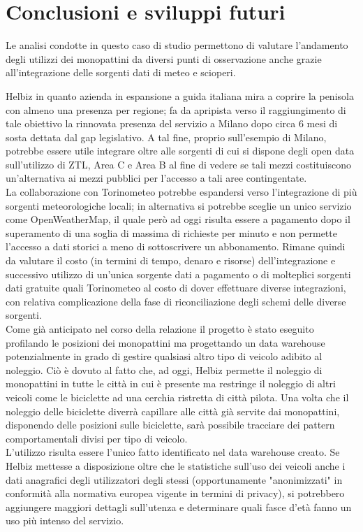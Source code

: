 \chapter{Conclusioni e sviluppi futuri}

Le analisi condotte in questo caso di studio permettono di valutare l'andamento degli 
utilizzi dei monopattini da diversi punti di osservazione anche grazie all’integrazione delle sorgenti dati
di meteo e scioperi.

Helbiz in quanto azienda in espansione a guida italiana mira a coprire la penisola con almeno una presenza per regione; 
fa da apripista verso il raggiungimento di tale obiettivo la rinnovata presenza del servizio a Milano dopo circa 6 mesi di sosta dettata dal gap legislativo.
A tal fine, proprio sull'esempio di Milano, potrebbe essere utile integrare oltre alle sorgenti di cui si dispone degli open data sull'utilizzo di ZTL,
Area C e Area B al fine di vedere se tali mezzi costituiscono un'alternativa ai mezzi pubblici per l'accesso a tali aree contingentate. \\

La collaborazione con Torinometeo potrebbe espandersi verso l'integrazione di più sorgenti meteorologiche locali;
in alternativa si potrebbe sceglie un unico servizio come OpenWeatherMap, il quale però ad oggi risulta essere a pagamento dopo il superamento di una soglia di
massima di richieste per minuto e non permette l'accesso a dati storici a meno di sottoscrivere un abbonamento.
Rimane quindi da valutare il costo (in termini di tempo, denaro e risorse) dell'integrazione e successivo utilizzo di un'unica sorgente dati a pagamento o di
molteplici sorgenti dati gratuite quali Torinometeo al costo di dover effettuare diverse integrazioni, con relativa complicazione della fase di
riconciliazione degli schemi delle diverse sorgenti.\\

Come già anticipato nel corso della relazione il progetto è stato eseguito profilando le posizioni dei monopattini ma progettando un data warehouse potenzialmente
in grado di gestire qualsiasi altro tipo di veicolo adibito al noleggio.
Ciò è dovuto al fatto che, ad oggi, Helbiz permette il noleggio di monopattini in tutte le città in cui è presente ma restringe il noleggio di altri veicoli come
le biciclette ad una cerchia ristretta di città pilota.
Una volta che il noleggio delle biciclette diverrà capillare alle città già servite dai monopattini, disponendo delle posizioni sulle biciclette,
sarà possibile tracciare dei pattern comportamentali divisi per tipo di veicolo.\\

L'utilizzo risulta essere l'unico fatto identificato nel data warehouse creato. Se Helbiz mettesse a disposizione oltre che le statistiche sull'uso dei veicoli
anche i dati anagrafici degli utilizzatori degli stessi (opportunamente "anonimizzati" in conformità alla normativa europea vigente in termini di privacy),
si potrebbero aggiungere maggiori dettagli sull'utenza e determinare quali fasce d'età fanno un uso più intenso del servizio.
